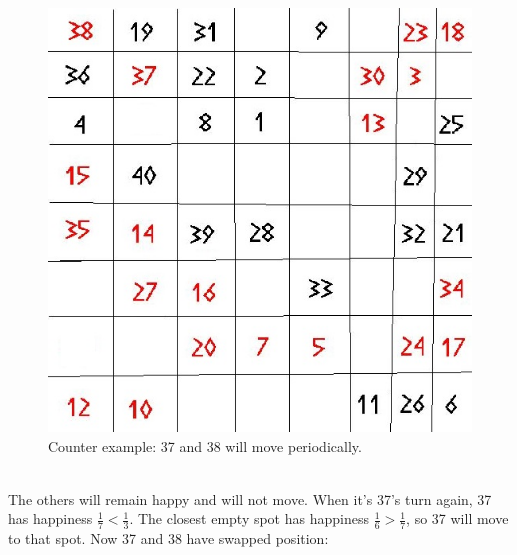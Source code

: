 \documentclass{article}
\begin{document}
\begin{figure}[!ht]
\begin{center}
\includegraphics[scale=0.25]{segregation_tegenvb_2.jpg}
\end{center}
\caption{Counter example: 37 and 38 will move periodically.}\label{counterexample2}
\end{figure}
\\The others will remain happy and will not move. When it's 37's turn again, 37 has happiness $\frac{1}{7} < \frac{1}{3}$. The closest empty spot has happiness $\frac{1}{6} > \frac{1}{7}$, so 37 will move to that spot. Now 37 and 38 have swapped position:
\end{document}
